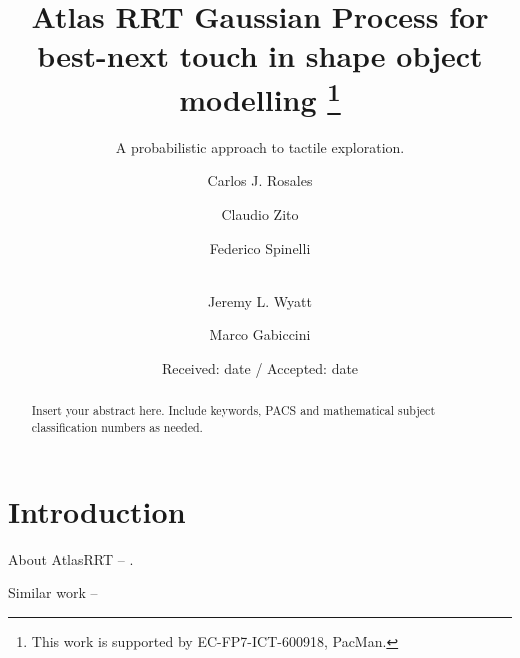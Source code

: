 \documentclass[twocolumn,draft,natbib]{svjour3}
\begin{document}
\title{Atlas RRT Gaussian Process for best-next touch in shape object modelling
  \thanks{This work is supported by EC-FP7-ICT-600918, PacMan.}
}
\subtitle{A probabilistic approach to tactile exploration.}

\author{Carlos J. Rosales         \and
        Claudio Zito              \and
        Federico Spinelli         \and \\
        Jeremy L. Wyatt           \and
        Marco Gabiccini           \and
}


\date{Received: date / Accepted: date}


\maketitle

\begin{abstract}
Insert your abstract here. Include keywords, PACS and mathematical
subject classification numbers as needed.
\end{abstract}

\section{Introduction}
\label{intro}

About AtlasRRT -- \citet{Jaillet2013Path}.

Similar work -- \citet{Bjorkman2013Enhancing}
\end{document}
